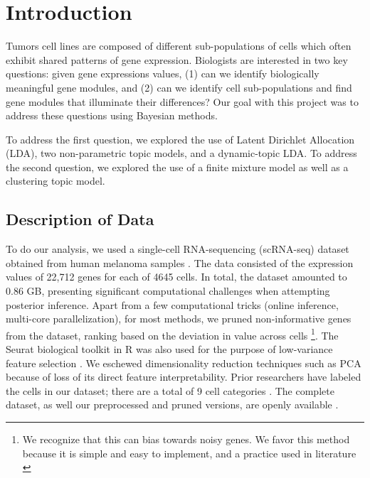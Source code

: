 \documentclass{article}
\begin{document}
 


\section{Introduction}
\label{intro}
Tumors cell lines are composed of different sub-populations of cells which often exhibit shared patterns of gene expression. Biologists are interested in two key questions: given gene expressions values, (1) can we identify biologically meaningful gene modules, and (2) can we identify cell sub-populations and find gene modules that illuminate their differences? Our goal with this project was to address these questions using Bayesian methods.

To address the first question, we explored the use of Latent Dirichlet Allocation (LDA), two non-parametric topic models, and a dynamic-topic LDA. To address the second question, we explored the use of a finite mixture model as well as a clustering topic model.

\subsection{Description of Data}
To do our analysis, we used a single-cell RNA-sequencing (scRNA-seq) dataset obtained from human melanoma samples \cite{melanoma}. The data consisted of the expression values of 22,712 genes for each of 4645 cells. In total, the dataset amounted to 0.86 GB, presenting significant computational challenges when attempting posterior inference. Apart from a few computational tricks (online inference, multi-core parallelization), for most methods, we pruned non-informative genes from the dataset, ranking based on the deviation in value across cells \footnote{We recognize that this can bias towards noisy genes. We favor this method because it is simple and easy to implement, and a practice used in literature \cite{pruning}}. The Seurat biological toolkit in R was also used for the purpose of low-variance feature selection \cite{seurat}. We eschewed dimensionality reduction techniques such as PCA because of loss of its direct feature interpretability. Prior researchers have labeled the cells in our dataset; there are a total of 9 cell categories \cite{melanoma}. The complete dataset, as well our preprocessed and pruned versions, are openly available \cite{dataset}.
\end{document}
